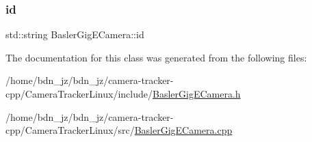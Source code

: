 \mbox{\label{class_basler_gig_e_camera_a1f2a44906ddb75d4fa3b0d37bc6a131e}} 
\subsubsection{\texorpdfstring{id}{id}}
{\footnotesize\ttfamily std\+::string Basler\+Gig\+E\+Camera\+::id\hspace{0.3cm}{\ttfamily [private]}}



The documentation for this class was generated from the following files\+:\begin{DoxyCompactItemize}
\item 
/home/bdn\+\_\+jz/bdn\+\_\+jz/camera-\/tracker-\/cpp/\+Camera\+Tracker\+Linux/include/\hyperlink{_basler_gig_e_camera_8h}{Basler\+Gig\+E\+Camera.\+h}\item 
/home/bdn\+\_\+jz/bdn\+\_\+jz/camera-\/tracker-\/cpp/\+Camera\+Tracker\+Linux/src/\hyperlink{_basler_gig_e_camera_8cpp}{Basler\+Gig\+E\+Camera.\+cpp}\end{DoxyCompactItemize}

